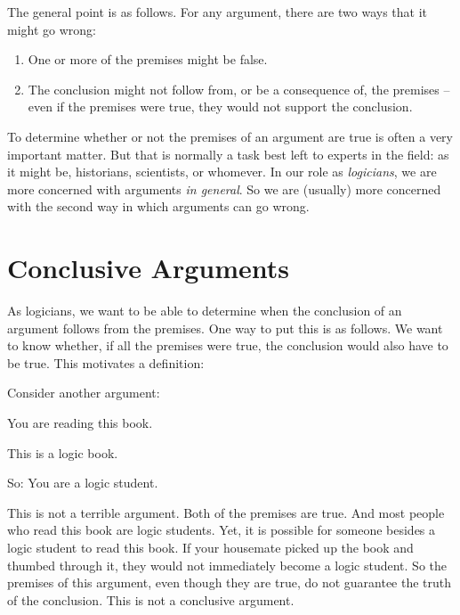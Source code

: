 The general point is as follows. For any argument, there are two ways that it might go wrong:
	\begin{enumerate}
		\item One or more of the premises might be false. 
		\item The conclusion might not follow from, or be a consequence of, the premises – even if the premises were true, they would not support the conclusion. 
	\end{enumerate}
To determine whether or not the premises of an argument are true is often a very important matter. But that is normally a task best left to experts in the field: as it might be, historians, scientists, or whomever. In our role as \emph{logicians}, we are more concerned with arguments \emph{in general}. So we are (usually) more concerned with the second way in which arguments can go wrong.


\section{Conclusive Arguments} \label{s:conclusiveargs}
As logicians, we want to be able to determine when the conclusion of an argument follows from the premises. One way to put this is as follows. We want to know whether, if all the premises were true, the conclusion would also have to be true. This motivates a definition:



Consider another argument:
	\begin{earg}
		\item[] You are reading this book.
		\item[] This is a logic book.
		\item[So:] You are a logic student.
	\end{earg}
This is not a terrible argument. Both of the premises are true. And most people who read this book are logic students. Yet, it is possible for someone besides a logic student to read this book. If your housemate picked up the book and thumbed through it, they would not immediately become a logic student. So the premises of this argument, even though they are true, do not guarantee the truth of the conclusion. This is not a conclusive argument.

